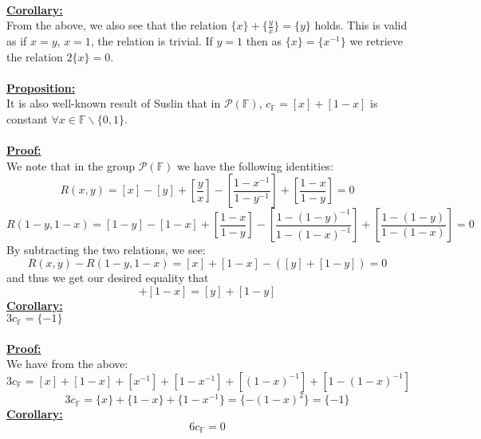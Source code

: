 \documentclass[11pt]{article}
\theoremstyle{plain}
\theoremstyle{definition}
\begin{document}
\\
\textbf{\underline{Corollary:}} \\
From the above, we also see that the relation $\{x\} + \{\frac{y}{x}\} = \{y\}$ holds. This is valid as if $x=y$, $x=1$, the relation is trivial. If $y=1$ then as $\{x\}=\{x^{-1}\}$ we retrieve the relation $2\{x\} =0$. \\
\\
\textbf{\underline{Proposition:}} \\
It is also well-known result of Suslin \cite{Sus90} that in $\mathcal{P}(\mathbb{F})$, $c_{\mathbb{F}} = [x] + [1-x]$ is constant $\forall x \in \mathbb{F} \backslash \{0,1\}$. \\
\\
\textbf{\underline{Proof:}} \\
We note that in the group $\mathcal{P} (\mathbb{F})$ we have the following identities:
\begin{equation*}
R(x,y) = [x] - [y] + [\frac{y}{x}] - [\frac{1-x^{-1}}{1-y^{-1}}] + [\frac{1-x}{1-y}] =0
\end{equation*}
\begin{equation*}
R(1-y,1-x) = [1-y] - [1-x] + [\frac{1-x}{1-y}] - [\frac{1-(1-y)^{-1}}{1-(1-x)^{-1}}] + [\frac{1-(1-y)}{1-(1-x)}] =0
\end{equation*}
By subtracting the two relations, we see:
\begin{equation*}
R(x,y) -  R(1-y,1-x)  = [x] + [1-x] - ([y] + [1-y]) = 0
\end{equation*}
and thus we get our desired equality that 
\begin{equation*} 
[x] + [1-x] = [y] + [1-y]
\end{equation*}
\textbf{\underline{Corollary:}} \\
$3 c_{\mathbb{F}} = \{-1\}$ \\
\\
\textbf{\underline{Proof:}}\\
We have from the above:
\begin{equation*}
3 c_{\mathbb{F}} = [x] + [1-x] + [x^{-1}] + [1-x^{-1}] + [(1-x)^{-1}] + [1-(1-x)^{-1}]
\end{equation*}
\begin{equation*}
3 c_{\mathbb{F}} = \{x\} + \{1-x\} + \{1-x^{-1}\} = \{-(1-x)^2\} = \{-1\}
\end{equation*}
\textbf{\underline{Corollary:}}\\
\begin{equation*}
6 c_{\mathbb{F}} = 0
\end{equation*}
\end{document}
